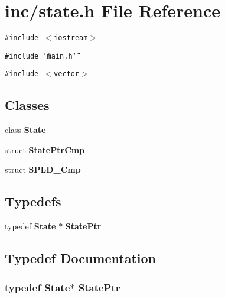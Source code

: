 \section{inc/state.h File Reference}
\label{state_8h}
{\tt \#include $<$iostream$>$}\par
{\tt \#include \char`\"{}main.h\char`\"{}}\par
{\tt \#include $<$vector$>$}\par
\subsection*{Classes}
\begin{CompactItemize}
\item 
class {\bf State}
\item 
struct {\bf StatePtrCmp}
\item 
struct {\bf SPLD\_\-Cmp}
\end{CompactItemize}
\subsection*{Typedefs}
\begin{CompactItemize}
\item 
typedef {\bf State} $\ast$ {\bf StatePtr}
\end{CompactItemize}


\subsection{Typedef Documentation}
\subsubsection{\setlength{\rightskip}{0pt plus 5cm}typedef {\bf State}$\ast$ {\bf StatePtr}}\label{state_8h_e7759b4b78d3744cd7da62f7aea5ff8f}


